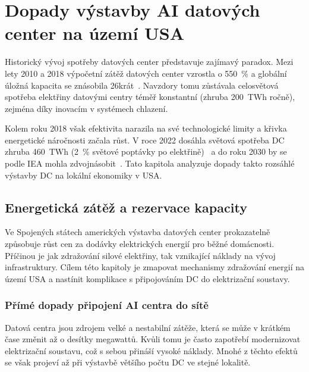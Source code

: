 \chapter{Dopady výstavby AI datových center na území USA}
\label{chap:dopady_usa}

Historický vývoj spotřeby datových center představuje zajímavý paradox. Mezi lety 2010 a 2018 výpočetní zátěž datových center vzrostla o 550~\% a globální úložná kapacita se znásobila 26krát~\cite[s.~10]{de_roucy-rochegonde_ai_2025}. Navzdory tomu zůstávala celosvětová spotřeba elektřiny datovými centry téměř konstantní (zhruba 200~TWh ročně), zejména díky inovacím v systémech chlazení.~\cite[s.~255]{barroso_data_2026}

Kolem roku 2018 však efektivita narazila na své technologické limity a křivka energetické náročnosti začala růst. V roce 2022 dosáhla světová spotřeba DC zhruba 460~TWh (2~\% světové poptávky po elektřině)~\cite{de_roucy-rochegonde_ai_2025, sheng_power_2026} a do roku 2030 by se podle IEA mohla zdvojnásobit~\cite[s.~14]{international_energy_agency_iea_energy_2025}. Tato kapitola analyzuje dopady takto rozsáhlé výstavby DC na lokální ekonomiky v USA.

\section{Energetická zátěž a rezervace kapacity}
\label{sec:energie_dopady}

Ve Spojených státech amerických výstavba datových center prokazatelně způsobuje růst cen za dodávky elektrických energií pro běžné domácnosti. Příčinou je jak zdražování silové elektřiny, tak vznikající náklady na vývoj infrastruktury. Cílem této kapitoly je zmapovat mechanismy zdražování energií na území USA a nastínit komplikace s připojováním DC do elektrizační soustavy.

\subsection{Přímé dopady připojení AI centra do sítě}
\label{subsec:energie_dopady_prime}

Datová centra jsou zdrojem velké a nestabilní zátěže, která se může v krátkém čase změnit až o desítky megawattů. Kvůli tomu je často zapotřebí modernizovat elektrizační soustavu, což s sebou přináší vysoké náklady. Mnohé z těchto efektů se však projeví až při výstavbě většího počtu DC ve stejné lokalitě.

